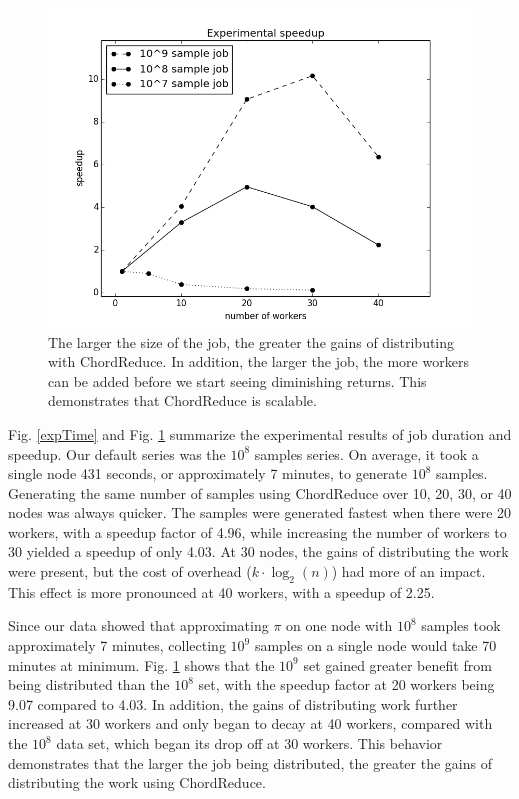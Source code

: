 \documentclass[10pt, conference, compsocconf]{IEEEtran}
\begin{document}
\begin{figure}
    \includegraphics[width=\linewidth]{expSpeed}
    \caption{The larger the size of the job, the greater the gains of distributing with ChordReduce.  In addition, the larger the job, the more workers can be added before we start seeing diminishing returns.  This demonstrates that ChordReduce is scalable.}
    \label{expSpeed}
\end{figure}

Fig. \ref{expTime} and Fig. \ref{expSpeed} summarize the experimental results of job duration and speedup.  Our default series was the $10^{8}$ samples series.  On average, it took a single node 431 seconds, or approximately 7 minutes, to generate $10^{8}$ samples.  Generating the same number of samples using ChordReduce over 10, 20, 30, or 40 nodes was always quicker.  The samples were generated fastest when there were 20 workers, with a speedup factor of 4.96, while increasing the number of workers to 30 yielded a speedup of only 4.03.  At 30 nodes, the gains of distributing the work were present, but the cost of overhead ($k \cdot \log_{2}(n)$) had more of an impact.  This effect is more pronounced at 40 workers, with a speedup of 2.25.

Since our data showed that approximating $\pi$ on one node with $10^{8}$ samples took approximately 7 minutes, collecting $10^{9}$ samples on a single node would take 70 minutes at minimum.  Fig. \ref{expSpeed} shows that the $10^{9}$ set gained greater benefit from being distributed than the $10^{8}$ set, with the speedup factor at 20 workers being 9.07 compared to 4.03.  In addition, the gains of distributing work further increased at 30 workers and only began to decay at 40 workers, compared with the $10^{8}$ data set, which began its drop off at 30 workers. This behavior demonstrates that the larger the job being distributed, the greater the gains of distributing the work using ChordReduce.
\end{document}

